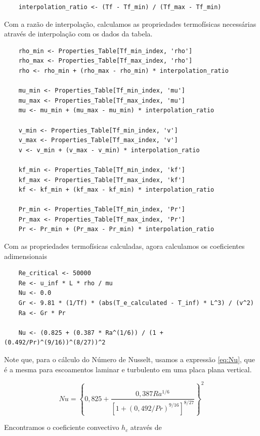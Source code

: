 \documentclass[12pt]{scrartcl}
\begin{document}
\begin{lstlisting}
    interpolation_ratio <- (Tf - Tf_min) / (Tf_max - Tf_min)
\end{lstlisting}

Com a razão de interpolação, calculamos as propriedades termofísicas necessárias através de interpolação 
com os dados da tabela.

\begin{lstlisting}
    rho_min <- Properties_Table[Tf_min_index, 'rho']
    rho_max <- Properties_Table[Tf_max_index, 'rho']
    rho <- rho_min + (rho_max - rho_min) * interpolation_ratio
    
    mu_min <- Properties_Table[Tf_min_index, 'mu']
    mu_max <- Properties_Table[Tf_max_index, 'mu']
    mu <- mu_min + (mu_max - mu_min) * interpolation_ratio
    
    v_min <- Properties_Table[Tf_min_index, 'v']
    v_max <- Properties_Table[Tf_max_index, 'v']
    v <- v_min + (v_max - v_min) * interpolation_ratio
    
    kf_min <- Properties_Table[Tf_min_index, 'kf']
    kf_max <- Properties_Table[Tf_max_index, 'kf']
    kf <- kf_min + (kf_max - kf_min) * interpolation_ratio
    
    Pr_min <- Properties_Table[Tf_min_index, 'Pr']
    Pr_max <- Properties_Table[Tf_max_index, 'Pr']
    Pr <- Pr_min + (Pr_max - Pr_min) * interpolation_ratio
\end{lstlisting}

Com as propriedades termofísicas calculadas, agora calculamos os coeficientes
adimensionais

\begin{lstlisting}
    Re_critical <- 50000
    Re <- u_inf * L * rho / mu
    Nu <- 0.0
    Gr <- 9.81 * (1/Tf) * (abs(T_e_calculated - T_inf) * L^3) / (v^2)
    Ra <- Gr * Pr

    Nu <- (0.825 + (0.387 * Ra^(1/6)) / (1 + (0.492/Pr)^(9/16))^(8/27))^2
\end{lstlisting}

Note que, para o cálculo do Número de Nusselt, usamos a expressão \eqref{eq:Nu}, que 
é a mesma para escoamentos laminar e turbulento em uma placa plana vertical.

\begin{equation}\label{eq:Nu}
    Nu = \left\{ 0,825 + \frac{0,387Ra^{1/6}}{\left[1 + \left(0,492 / Pr\right)^{9/16}\right]^{8/27}} \right\}^2
\end{equation}

Encontramos o coeficiente convectivo $h_c$ através de 
\end{document}
